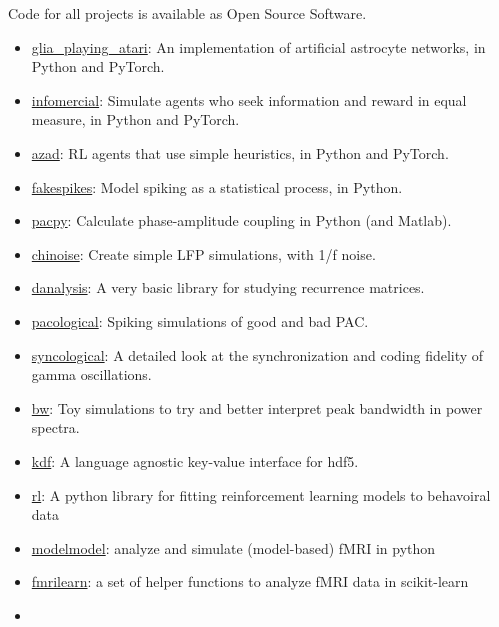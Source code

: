 Code for all projects is available as Open Source Software.

\begin{itemize}
\item
  \href{https://github.com/CoAxLab/glia_playing_atari}{glia\_playing\_atari}:
  An implementation of artificial astrocyte networks, in Python and
  PyTorch.
\item
  \href{https://github.com/CoAxLab/infomercial}{infomercial}: Simulate
  agents who seek information and reward in equal measure, in Python and
  PyTorch.
\item
  \href{https://github.com/CoAxLab/azad}{azad}: RL agents that use
  simple heuristics, in Python and PyTorch.
\item
  \href{https://github.com/voytekresearch/fakespikes}{fakespikes}: Model
  spiking as a statistical process, in Python.
\item
  \href{https://github.com/voytekresearch/pacpy}{pacpy}: Calculate
  phase-amplitude coupling in Python (and Matlab).
\item
  \href{https://github.com/voytekresearch/chinoise}{chinoise}: Create
  simple LFP simulations, with 1/f noise.
\item
  \href{https://github.com/voytekresearch/danalysis}{danalysis}: A very
  basic library for studying recurrence matrices.
\item
  \href{https://github.com/voytekresearch/pacological}{pacological}:
  Spiking simulations of good and bad PAC.
\item
  \href{https://github.com/voytekresearch/syncological}{syncological}: A
  detailed look at the synchronization and coding fidelity of gamma
  oscillations.
\item
  \href{https://github.com/voytekresearch/bw}{bw}: Toy simulations to
  try and better interpret peak bandwidth in power spectra.
\item
  \href{https://github.com/parenthetical-e/kdf}{kdf}: A language
  agnostic key-value interface for hdf5.
\item
  \href{https://github.com/parenthetical-e/rl}{rl}: A python library for
  fitting reinforcement learning models to behavoiral data
\item
  \href{http://parenthetical-e.github.io/modelmodel/}{modelmodel}:
  analyze and simulate (model-based) fMRI in python
\item
  \href{https://github.com/parenthetical-e/fmrilearn}{fmrilearn}: a set
  of helper functions to analyze fMRI data in scikit-learn
\item

\end{itemize}
